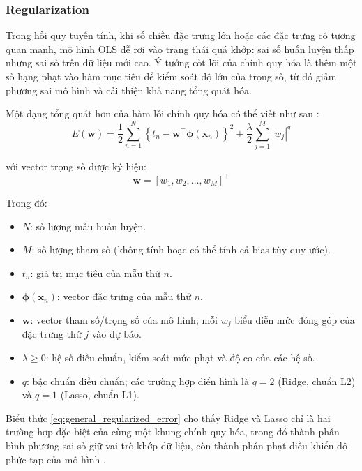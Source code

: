 \subsubsection{Regularization}
Trong hồi quy tuyến tính, khi số chiều đặc trưng lớn hoặc các đặc trưng có tương quan mạnh,
mô hình OLS dễ rơi vào trạng thái quá khớp: sai số huấn luyện thấp nhưng sai số
trên dữ liệu mới cao. Ý tưởng cốt lõi của chính quy hóa là thêm một số hạng phạt vào hàm mục tiêu
để kiểm soát độ lớn của trọng số, từ đó giảm phương sai mô hình và cải thiện khả năng tổng quát hóa.

Một dạng tổng quát hơn của hàm lỗi chính quy hóa có thể viết như sau \cite{bishop2006pattern}:
\begin{equation}
E(\mathbf{w}) = \frac{1}{2}\sum_{n=1}^{N}\left\{t_n-\mathbf{w}^{\top}\boldsymbol{\phi}(\mathbf{x}_n)\right\}^{2}
+ \frac{\lambda}{2}\sum_{j=1}^{M}|w_j|^{q}
\label{eq:general_regularized_error}
\end{equation}

với vector trọng số được ký hiệu:
\begin{equation}
\mathbf{w} = [w_1, w_2, \ldots, w_M]^\top
\label{eq:regularized_weight_vector}
\end{equation}

Trong đó:
\begin{itemize} [labelsep=10pt, leftmargin=2cm]
    \item $N$: số lượng mẫu huấn luyện.
    \item $M$: số lượng tham số (không tính hoặc có thể tính cả bias tùy quy ước).
    \item $t_n$: giá trị mục tiêu của mẫu thứ $n$.
    \item $\boldsymbol{\phi}(\mathbf{x}_n)$: vector đặc trưng của mẫu thứ $n$.
    \item $\mathbf{w}$: vector tham số/trọng số của mô hình; mỗi $w_j$ biểu diễn mức đóng góp của đặc trưng thứ $j$ vào dự báo.
    \item $\lambda \ge 0$: hệ số điều chuẩn, kiểm soát mức phạt và độ co của các hệ số.
    \item $q$: bậc chuẩn điều chuẩn; các trường hợp điển hình là $q=2$ (Ridge, chuẩn L2) và $q=1$ (Lasso, chuẩn L1).
\end{itemize}

Biểu thức \eqref{eq:general_regularized_error} cho thấy Ridge và Lasso chỉ là hai trường hợp đặc biệt
của cùng một khung chính quy hóa, trong đó thành phần bình phương sai số giữ vai trò khớp dữ liệu,
còn thành phần phạt điều khiển độ phức tạp của mô hình \cite{bishop2006pattern}.

